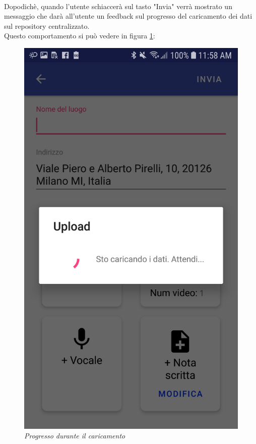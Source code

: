 \\Dopodichè, quando l'utente schiaccerà sul tasto "Invia" verrà mostrato un messaggio che darà all'utente un feedback sul progresso del caricamento dei dati sul repository centralizzato.
\\Questo comportamento si può vedere in figura \ref{fig:progresso}:
\begin{figure}[!h]
    \centering
	\includegraphics[scale=0.135]{Tesi/images/Progresso}
	\caption{\textit{Progresso durante il caricamento}}
	\label{fig:progresso}
\end{figure}\pagebreak

